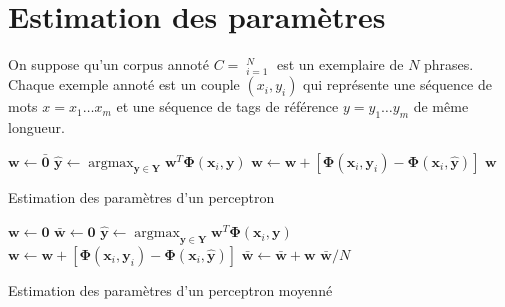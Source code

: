 \documentclass[11pt,openany]{book}
\begin{document}
\section{Estimation des paramètres}

On suppose qu’un corpus annoté $C = \mathop{(\mathbf{x}_i,\mathbf{y}_i)}^N_{i=1}$ est un
exemplaire de $N$ phrases. 
Chaque exemple annoté est un couple $(x_i , y_i )$ qui représente une
séquence de mots $x = x_1 \ldots x_m$ et une séquence de tags de
référence $y = y_1 \ldots y_m$ de même longueur.

\begin{algorithm}[htbp]
\begin{algorithmic}[1]
\State $\mathbf{w} \gets \bar{\mathbf{0}}$
\State
$\hat{\mathbf{y}} \gets \mathop{\text{argmax}}_{\mathbf{y}\in \mathbf{Y}} \mathbf{w}^T \boldsymbol\Phi(\mathbf{x}_i,\mathbf{y})$
\label{algoline-pseudoargmax}
     \State $\mathbf{w} \gets  \mathbf{w} +
     \left[\boldsymbol\Phi(\mathbf{x}_i,\mathbf{y}_i) 
       - \boldsymbol\Phi(\mathbf{x}_i,\hat{\mathbf{y}})  \right]$ 
     \label{algoline-update}
\EndIf
\EndFor
\EndFor
\State \Return $\mathbf{w}$
\EndFunction
\end{algorithmic}
\caption{\label{algo-perceptron-train}Estimation des paramètres d'un
  perceptron}
\end{algorithm}


\begin{algorithm}[htbp]
\begin{algorithmic}[1]
\State $\mathbf{w} \gets \mathbf{0}$
\State $\bar{\mathbf{w}} \gets \mathbf{0}$
\State $\hat{\mathbf{y}} \gets \mathop{\text{argmax}}_{\mathbf{y}\in \mathbf{Y}} \mathbf{w}^T \boldsymbol\Phi(\mathbf{x}_i,\mathbf{y})$
     \State $\mathbf{w} \gets  \mathbf{w} +
     \left[\boldsymbol\Phi(\mathbf{x}_i,\mathbf{y}_i) 
       - \boldsymbol\Phi(\mathbf{x}_i,\hat{\mathbf{y}})  \right]$ 
\EndIf
\State $\bar{\mathbf{w}} \gets \bar{\mathbf{w}}+\mathbf{w}$
\EndFor
\EndFor
\State \Return $\bar{\mathbf{w}}/N$
\EndFunction
\end{algorithmic}
\caption{\label{algo-perceptron-train-avg}Estimation des paramètres d'un
  perceptron moyenné}
\end{algorithm}
\end{document}
